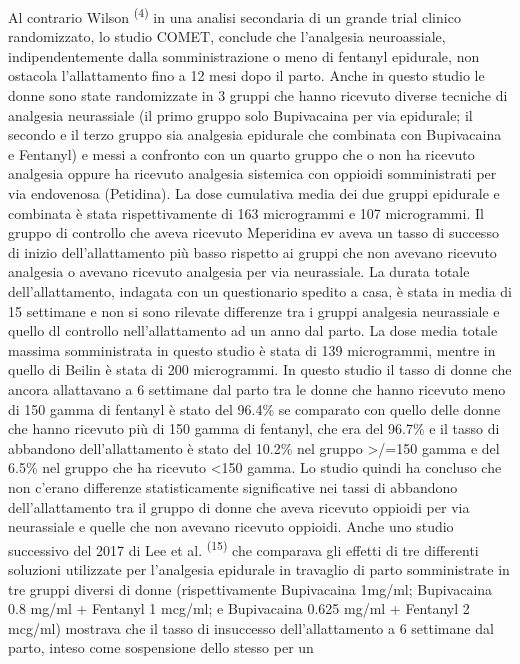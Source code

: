 \documentclass[]{article}
\begin{document}
Al contrario Wilson \textsuperscript{(4)} in una analisi secondaria di
un grande trial clinico randomizzato, lo studio COMET, conclude che
l'analgesia neuroassiale, indipendentemente dalla somministrazione o
meno di fentanyl epidurale, non ostacola l'allattamento fino a 12 mesi
dopo il parto. Anche in questo studio le donne sono state randomizzate
in 3 gruppi che hanno ricevuto diverse tecniche di analgesia neurassiale
(il primo gruppo solo Bupivacaina per via epidurale; il secondo e il
terzo gruppo sia analgesia epidurale che combinata con Bupivacaina e
Fentanyl) e messi a confronto con un quarto gruppo che o non ha ricevuto
analgesia oppure ha ricevuto analgesia sistemica con oppioidi
somministrati per via endovenosa (Petidina). La dose cumulativa media
dei due gruppi epidurale e combinata è stata rispettivamente di 163
microgrammi e 107 microgrammi. Il gruppo di controllo che aveva ricevuto
Meperidina ev aveva un tasso di successo di inizio dell'allattamento più
basso rispetto ai gruppi che non avevano ricevuto analgesia o avevano
ricevuto analgesia per via neurassiale. La durata totale
dell'allattamento, indagata con un questionario spedito a casa, è stata
in media di 15 settimane e non si sono rilevate differenze tra i gruppi
analgesia neurassiale e quello dl controllo nell'allattamento ad un anno
dal parto. La dose media totale massima somministrata in questo studio è
stata di 139 microgrammi, mentre in quello di Beilin è stata di 200
microgrammi. In questo studio il tasso di donne che ancora allattavano a
6 settimane dal parto tra le donne che hanno ricevuto meno di 150 gamma
di fentanyl è stato del 96.4\% se comparato con quello delle donne che
hanno ricevuto più di 150 gamma di fentanyl, che era del 96.7\% e il
tasso di abbandono dell'allattamento è stato del 10.2\% nel gruppo
\textgreater{}/=150 gamma e del 6.5\% nel gruppo che ha ricevuto
\textless{}150 gamma. Lo studio quindi ha concluso che non c'erano
differenze statisticamente significative nei tassi di abbandono
dell'allattamento tra il gruppo di donne che aveva ricevuto oppioidi per
via neurassiale e quelle che non avevano ricevuto oppioidi. Anche uno
studio successivo del 2017 di Lee et al. \textsuperscript{(15)} che
comparava gli effetti di tre differenti soluzioni utilizzate per
l'analgesia epidurale in travaglio di parto somministrate in tre gruppi
diversi di donne (rispettivamente Bupivacaina 1mg/ml; Bupivacaina 0.8
mg/ml + Fentanyl 1 mcg/ml; e Bupivacaina 0.625 mg/ml + Fentanyl 2
mcg/ml) mostrava che il tasso di insuccesso dell'allattamento a 6
settimane dal parto, inteso come sospensione dello stesso per un
\end{document}
